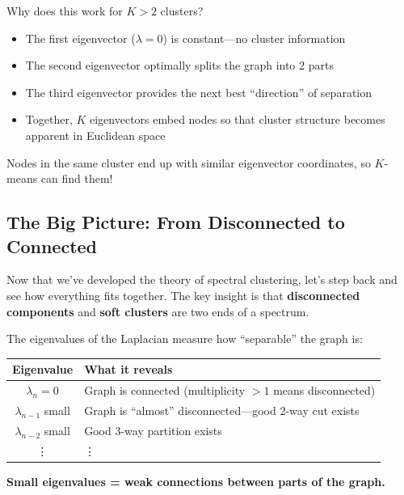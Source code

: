 \begin{notechapter}
\begin{intuition}
Why does this work for $K > 2$ clusters?
\begin{itemize}
    \item The first eigenvector ($\lambda = 0$) is constant---no cluster information
    \item The second eigenvector optimally splits the graph into 2 parts
    \item The third eigenvector provides the next best ``direction'' of separation
    \item Together, $K$ eigenvectors embed nodes so that cluster structure becomes apparent in Euclidean space
\end{itemize}

Nodes in the same cluster end up with similar eigenvector coordinates, so $K$-means can find them!
\end{intuition}

\subsection{The Big Picture: From Disconnected to Connected}

Now that we've developed the theory of spectral clustering, let's step back and see how everything fits together. The key insight is that \textbf{disconnected components} and \textbf{soft clusters} are two ends of a spectrum.

\begin{keyidea}
The eigenvalues of the Laplacian measure how ``separable'' the graph is:

\begin{center}
\begin{tabular}{cl}
\toprule
\textbf{Eigenvalue} & \textbf{What it reveals} \\
\midrule
$\lambda_n = 0$ & Graph is connected (multiplicity $>1$ means disconnected) \\
$\lambda_{n-1}$ small & Graph is ``almost'' disconnected---good 2-way cut exists \\
$\lambda_{n-2}$ small & Good 3-way partition exists \\
\vdots & \vdots \\
\bottomrule
\end{tabular}
\end{center}

\textbf{Small eigenvalues = weak connections between parts of the graph.}
\end{keyidea}


\end{notechapter}

